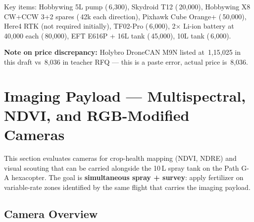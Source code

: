 \documentclass[11pt,a4paper]{article}
\newcommand{\Rs}{\rupee\,}
\begin{document}
Key items: Hobbywing 5L pump (\Rs{}6,300), Skydroid T12 (\Rs{}20,000), Hobbywing X8 CW+CCW 3+2 spares (\Rs{}42k each direction), Pixhawk Cube Orange+ (\Rs{}50,000), Here4 RTK (not required initially), TF02-Pro (\Rs{}6,000), 2$\times$ Li-ion battery at \Rs{}40,000 each (\Rs{}80,000), EFT E616P + 16L tank (\Rs{}45,000), 10L tank (\Rs{}6,000).

\textbf{Note on price discrepancy:} Holybro DroneCAN M9N listed at \Rs{}1,15,025 in this draft vs \Rs{}8,036 in teacher RFQ --- this is a paste error, actual price is \Rs{}8,036.

\section{Imaging Payload --- Multispectral, NDVI, and RGB-Modified Cameras}

This section evaluates cameras for crop-health mapping (NDVI, NDRE) and visual scouting that can be carried alongside the 10\,L spray tank on the Path G-A hexacopter. The goal is \textbf{simultaneous spray + survey}: apply fertilizer on variable-rate zones identified by the same flight that carries the imaging payload.

\subsection{Camera Overview}
\end{document}
